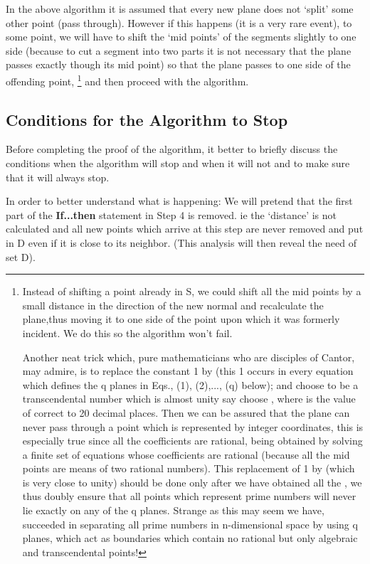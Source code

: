 \documentclass[english]{article}
\begin{document}
In the above algorithm it is assumed that every new plane does not
`split' some other point (pass through). However if this happens (it
is a very rare event), to some point, we will have to shift the `mid
points' of the segments slightly to one side (because to cut a segment
into two parts it is not necessary that the plane passes exactly though
its mid point) so that the plane passes to one side of the offending
point, \footnote{Instead of shifting a point already in S, we could shift all the mid points
by a small distance  in the direction of the new normal
and recalculate the plane,thus moving it to one side
of the point upon which it was formerly incident. We do this so the algorithm won't fail. 

Another neat trick
which, pure mathematicians who are disciples of Cantor, may admire, is to replace the constant 1 by 
 (this 1 occurs in every  equation
 which defines the q  planes in Eqs., (1), (2),..., (q) below); and choose  to be a transcendental number which is almost unity say choose , where  is the value of  correct  to 20 decimal places.
Then we can be assured that the plane can never pass through a point which is represented by integer coordinates,
 this is especially true since all the coefficients  are rational, being obtained by solving a finite set of equations whose coefficients are rational (because all the mid points are means of two rational numbers). This replacement of 1 by  (which is very close to unity) should be done only after we have obtained all the ,  we thus doubly ensure that all points which represent prime numbers will never lie exactly on any of the q planes. Strange as this may seem we have, succeeded in separating all prime numbers in n-dimensional space by using q planes, which act as boundaries which contain no rational but only algebraic and transcendental points!} and then proceed with the algorithm.

\medskip{}



\subsection{Conditions for the Algorithm to Stop}

Before completing the proof of the algorithm, it better to briefly discuss
the conditions when the algorithm will stop and when it will not and
to make sure that it will always stop.

In order to better understand what is happening: We will pretend that
the first part of the \textbf{If...then} statement in Step 4 is removed.
ie the `distance' is not calculated and all new points which arrive
at this step are never removed and put in D even if it is close to
its neighbor. (This analysis will then reveal the need of set D).
\end{document}
